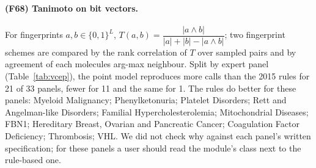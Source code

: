 \paragraph{(F68) Tanimoto on bit vectors.} For fingerprints $a,b\in\{0,1\}^L$, $T(a,b)=\dfrac{|a\wedge b|}{|a|+|b|-|a\wedge b|}$; two fingerprint schemes are compared by the rank correlation of $T$ over sampled pairs and by agreement of each molecule\textquotesingle{}s arg-max neighbour.
Split by expert panel (Table~\ref{tab:vcep}), the point model reproduces more calls than the 2015 rules for 21 of 33 panels, fewer for 11 and the same for 1. The rules do better for these panels: Myeloid Malignancy; Phenylketonuria; Platelet Disorders; Rett and Angelman-like Disorders; Familial Hypercholesterolemia; Mitochondrial Diseases; FBN1; Hereditary Breast, Ovarian and Pancreatic Cancer; Coagulation Factor Deficiency; Thrombosis; VHL. We did not check why against each panel's written specification; for these panels a user should read the module's class next to the rule-based one.
